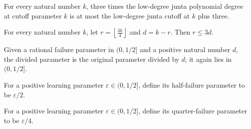 \begin{theorem}
\label{FABL.three_mul_lowDegreeJuntaPolynomialDegree_le_cutoff_add_three}
\leanok
{}
For every natural number $k$, three times the low-degree junta polynomial degree at
cutoff parameter $k$ is at most the low-degree junta cutoff at $k$ plus three.
\end{theorem}

\begin{theorem}
\label{FABL.lowDegreeJuntaCutoff_le_three_mul_polynomialDegree}
\leanok
{}
For every natural number $k$, let $r=\left\lfloor\frac{3k}{4}\right\rfloor$ and $d=k-r$.
Then $r\le 3d$.
\end{theorem}

\begin{definition}
\label{FABL.dividePositiveLearningParameter}
\leanok
{}
Given a rational failure parameter in $(0,1/2]$ and a positive natural number $d$, the
divided parameter is the original parameter divided by $d$; it again lies in $(0,1/2]$.
\end{definition}

\begin{definition}
\label{FABL.lowDegreeJuntaHalfFailure}
\leanok
{}
For a positive learning parameter $\varepsilon\in(0,1/2]$, define its half-failure
parameter to be $\varepsilon/2$.
\end{definition}

\begin{definition}
\label{FABL.lowDegreeJuntaQuarterFailure}
\leanok
{}
For a positive learning parameter $\varepsilon\in(0,1/2]$, define its quarter-failure
parameter to be $\varepsilon/4$.
\end{definition}

